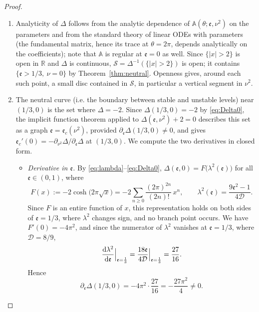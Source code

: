 \documentclass[reqno]{amsart}
\newcommand{\D}{\mathcal{D}}
\newcommand{\ee}{\mathfrak{e}}
\begin{document}
\begin{proof}
\begin{enumerate}
    \item [(i)] Analyticity of $\Delta$ follows from the analytic dependence of $\mathbb A(\theta;\ee,\nu^2)$ on the parameters and from the standard theory of linear ODEs with parameters (the fundamental matrix, hence its trace at $\theta=2\pi$, depends analytically on the coefficients); note that $\mathbb A$ is regular at $\ee=0$ as well. Since $\{|x|>2\}$ is open in $\mathbb R$ and $\Delta$ is continuous, $\mathcal S=\Delta^{-1}(\{|x|>2\})$ is open; it contains $\{\ee>1/3,\ \nu=0\}$ by Theorem~\ref{thm:neutral}. Openness gives, around each such point, a small disc contained in $\mathcal S$, in particular a vertical segment in $\nu^2$.
\item[(ii)] The neutral curve (i.e. the boundary between stable and unstable levels) near $(1/3,0)$ is the set where $\Delta=-2$. Since $\Delta(1/3,0)=-2$ by \eqref{eq:Delta0}, the implicit function theorem applied to $\Delta(\ee,\nu^2)+2=0$ describes this set as a graph $\ee=\ee_c(\nu^2)$, provided $\partial_\ee\Delta(1/3,0)\neq0$, and gives $\ee_c'(0)=-\partial_{\nu^2}\Delta/\partial_\ee\Delta$ at $(1/3,0)$. We compute the two derivatives in closed form.
\begin{itemize}
\item \emph{Derivative in $\ee$.} By \eqref{eq:lambda}--\eqref{eq:Delta0}, $\Delta(\ee,0)=F\big(\lambda^2(\ee)\big)$ for all $\ee\in(0,1)$, where
\[
F(x):=-2\cosh\big(2\pi\sqrt x\big)=-2\sum_{n\ge0}\frac{(2\pi)^{2n}}{(2n)!}\,x^{n},\qquad \lambda^2(\ee)=\frac{9\ee^2-1}{4\D}.
\]
Since $F$ is an entire function of $x$, this representation holds on both sides of $\ee=1/3$, where $\lambda^2$ changes sign, and no branch point occurs. We have $F'(0)=-4\pi^2$, and since the numerator of $\lambda^2$ vanishes at $\ee=1/3$, where $\D=8/9$,
\[
\frac{{\rm d}\lambda^2}{{\rm d}\ee}\Big|_{\ee=\frac{1}{3}}=\frac{18\ee}{4\D}\Big|_{\ee=\frac{1}{3}}=\frac{27}{16}.
\]
Hence
\begin{equation}\label{eq:dDde}
\partial_\ee\Delta(1/3,0)=-4\pi^2\cdot\frac{27}{16}=-\frac{27\pi^2}{4}\neq0 .
\end{equation}





\end{itemize}
\end{enumerate}
\end{proof}
\end{document}
